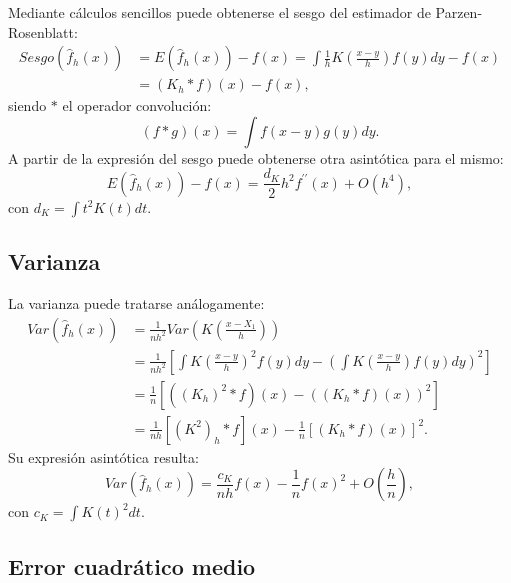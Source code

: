 \documentclass[
]{book}
\theoremstyle{break}
\theoremstyle{nonumberplain}
\begin{document}
Mediante cálculos sencillos puede obtenerse el sesgo del estimador de
Parzen-Rosenblatt:
\[\begin{aligned}
Sesgo\left( \hat{f}_{h}\left( x \right) \right) &= E\left( \hat{f}_{h}\left(
x \right) \right) -f\left( x \right) =\int \frac{1}{h}K\left( \frac{x-y}{h}
 \right) f\left( y \right) dy-f\left( x \right) \\
&= \left( K_{h}\ast f \right) \left( x \right) -f\left( x \right),
\end{aligned}\]
siendo \(\ast\) el operador convolución:
\[\left( f\ast g \right) \left( x \right) 
= \int f\left( x-y \right) g\left( y \right) dy.\]
A partir de la expresión del sesgo puede obtenerse otra
asintótica para el mismo:
\[E\left( \hat{f}_{h}\left( x \right) \right) -f\left( x \right) =\frac{d_{K}}{2}
h^2f^{\prime \prime }\left( x \right) +O\left( h^{4} \right),\]con
\(d_{K}=\int t^2K\left( t \right) dt\).

\subsection{Varianza}\label{varianza}

La varianza puede tratarse análogamente:
\[\begin{aligned}
Var\left( \hat{f}_{h}\left( x \right) \right) &= \frac{1}{nh^2}Var\left(
K\left( \frac{x-X_1}{h} \right) \right) \\
&= \frac{1}{nh^2}\left[ \int K\left( \frac{x-y}{h} \right)^2f\left(
y \right) dy-\left( \int K\left( \frac{x-y}{h} \right) f\left( y \right)
dy \right)^2\right] \\
&= \frac{1}{n}\left[ \left( \left( K_{h} \right)^2\ast f \right) \left(
x \right) -\left( \left( K_{h}\ast f \right) \left( x \right) \right)^2
\right] \\
&= \frac{1}{nh}\left[ \left( K^2 \right) _{h}\ast f\right] \left( x \right) -
\frac{1}{n}\left[ \left( K_{h}\ast f \right) \left( x \right) \right]^2.\end{aligned}\]Su
expresión asintótica resulta:
\[Var\left( \hat{f}_{h}\left( x \right) \right) =\frac{c_{K}}{nh}f\left(
x \right) - \frac{1}{n}f\left( x \right)^2 + O\left( \frac{h}{n} \right),\]
con \(c_{K}=\int K\left( t \right)^2dt\).

\subsection{Error cuadrático medio}\label{error-cuadruxe1tico-medio}
\end{document}
